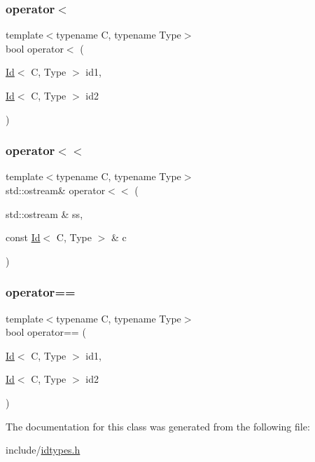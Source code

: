 \subsubsection{\texorpdfstring{operator$<$}{operator<}}
{\footnotesize\ttfamily template$<$typename C, typename Type$>$ \\
bool operator$<$ (\begin{DoxyParamCaption}\item[{\mbox{\hyperlink{classtypes_1_1_id}{Id}}$<$ C, Type $>$}]{id1,  }\item[{\mbox{\hyperlink{classtypes_1_1_id}{Id}}$<$ C, Type $>$}]{id2 }\end{DoxyParamCaption})\hspace{0.3cm}{\ttfamily [friend]}}

\mbox{\label{classtypes_1_1_id_ab2773c62c8f10c14d6cca24b2c51b222}} 
\subsubsection{\texorpdfstring{operator$<$$<$}{operator<<}}
{\footnotesize\ttfamily template$<$typename C, typename Type$>$ \\
std\+::ostream\& operator$<$$<$ (\begin{DoxyParamCaption}\item[{std\+::ostream \&}]{ss,  }\item[{const \mbox{\hyperlink{classtypes_1_1_id}{Id}}$<$ C, Type $>$ \&}]{c }\end{DoxyParamCaption})\hspace{0.3cm}{\ttfamily [friend]}}

\mbox{\label{classtypes_1_1_id_a04078fd618a64803321fd0badf4447e2}} 
\subsubsection{\texorpdfstring{operator==}{operator==}}
{\footnotesize\ttfamily template$<$typename C, typename Type$>$ \\
bool operator== (\begin{DoxyParamCaption}\item[{\mbox{\hyperlink{classtypes_1_1_id}{Id}}$<$ C, Type $>$}]{id1,  }\item[{\mbox{\hyperlink{classtypes_1_1_id}{Id}}$<$ C, Type $>$}]{id2 }\end{DoxyParamCaption})\hspace{0.3cm}{\ttfamily [friend]}}



The documentation for this class was generated from the following file\+:\begin{DoxyCompactItemize}
\item 
include/\mbox{\hyperlink{idtypes_8h}{idtypes.\+h}}\end{DoxyCompactItemize}
